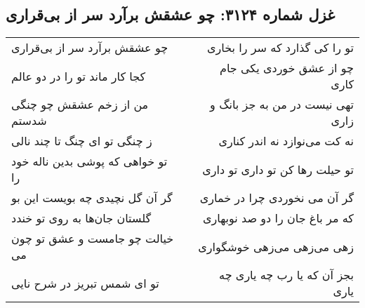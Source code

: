 \begin{center}
\section*{غزل شماره ۳۱۲۴: چو عشقش برآرد سر از بی‌قراری}
\label{sec:3124}
\begin{longtable}{l p{0.5cm} r}
چو عشقش برآرد سر از بی‌قراری
&&
تو را کی گذارد که سر را بخاری
\\
کجا کار ماند تو را در دو عالم
&&
چو از عشق خوردی یکی جام کاری
\\
من از زخم عشقش چو چنگی شدستم
&&
تهی نیست در من به جز بانگ و زاری
\\
ز چنگی تو ای چنگ تا چند نالی
&&
نه کت می‌نوازد نه اندر کناری
\\
تو خواهی که پوشی بدین ناله خود را
&&
تو حیلت رها کن تو داری تو داری
\\
گر آن گل نچیدی چه بویست این بو
&&
گر آن می نخوردی چرا در خماری
\\
گلستان جان‌ها به روی تو خندد
&&
که مر باغ جان را دو صد نوبهاری
\\
خیالت چو جامست و عشق تو چون می
&&
زهی می‌زهی می‌زهی خوشگواری
\\
تو ای شمس تبریز در شرح نایی
&&
بجز آن که یا رب چه یاری چه یاری
\\
\end{longtable}
\end{center}
